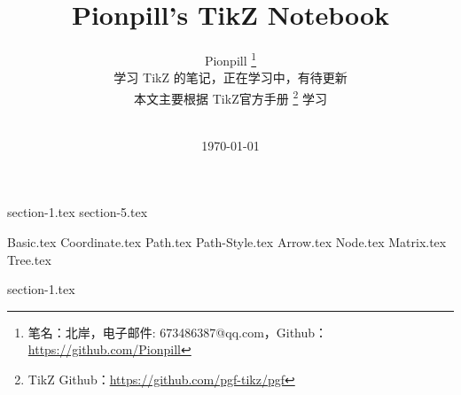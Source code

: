 \documentclass{PionpillNote-book}
\title{Pionpill's TikZ Notebook}
\author{
    Pionpill
    \footnote{笔名：北岸，电子邮件: 673486387@qq.com，Github：\url{https://github.com/Pionpill}}\\[2ex]
    学习 TikZ 的笔记，正在学习中，有待更新 \\
    本文主要根据 TikZ官方手册 \footnote{TikZ Github：\url{https://github.com/pgf-tikz/pgf}}  学习
    
    \\[2ex]
}
\date{\today}
\begin{document}
\maketitle                  %
\tableofcontents            %
\thispagestyle{empty}
\newpage
\setcounter{page}{1}


{section-1.tex}
{section-5.tex}

{Basic.tex}
{Coordinate.tex}
{Path.tex}
{Path-Style.tex}
{Arrow.tex}
{Node.tex}
{Matrix.tex}
{Tree.tex}

{section-1.tex}



\end{document}

